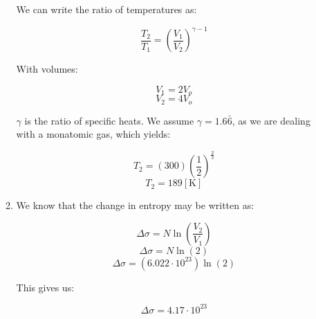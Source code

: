 \begin{enumerate}
\begin{enumerate}
        We can write the ratio of temperatures as:

        $$\frac{T_2}{T_1}=\left( \frac{V_1}{V_2} \right)^{\gamma-1}$$

        With volumes:

        $$V_1=2V_o$$
        $$V_2=4V_o$$

        $\gamma$ is the ratio of specific heats. We assume $\gamma=1.6\bar{6}$, as we are dealing with a monatomic gas, which yields:

        $$T_2=(300)\left( \frac{1}{2} \right)^{\frac{2}{3}}$$
        $$\boxed{T_2=189[\si{\kelvin}]}$$

      \item 

        We know that the change in entropy may be written as:

        $$\Delta\sigma=N\ln\left( \frac{V_2}{V_1} \right)$$
        $$\Delta\sigma=N\ln(2)$$
        $$\Delta\sigma=(6.022\cdot10^{23})\ln(2)$$

        This gives us:

        $$\boxed{\Delta\sigma=4.17\cdot10^{23}}$$

    \end{enumerate}

\end{enumerate}



